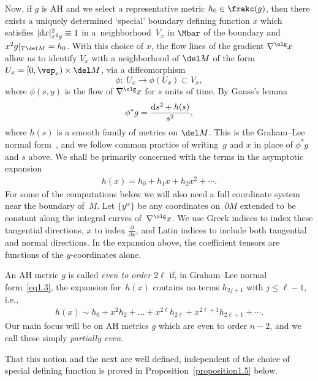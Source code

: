 Now, if $g$ is AH and we select a representative metric $h_0 \in \frakc(g)$, then there exists a uniquely determined
`special' boundary defining function $x$ which satisfies $|{\rm d}x|^2_{x^2 g} \equiv 1$ in a~neighborhood~$V_x$ in $\Mbar$ of the boundary and $x^2 g|_{T \del M} = h_0$.
With this choice of $x$, the flow lines of the gradient $\nabla^{\olg} x$ allow us to identify $V_x$ with a neighborhood of $\del M$ of the form $U_x = [0,\vep_x) \times \del M$, via a diffeomorphism
\[ \phi\colon \ U_x \longrightarrow \phi(U_x) \subset V_x, \]
where $\phi(s,y)$ is the flow of $\nabla^{\olg} x$ for $s$ units of time. By Gauss's lemma
\begin{gather} \label{eq1.3}
\phi^*g = \frac{{\rm d}s^2 + h(s)}{s^2},
\end{gather}
where $h(s)$ is a smooth family of metrics on $\del M$. This is the Graham--Lee normal form~\cite{GL}, and we follow common practice of writing~$g$ and $x$ in place of $\phi^* g$ and $s$ above. We shall be primarily concerned with the terms in the asymptotic expansion
\begin{gather*}
h(x) = h_0 + h_1 x + h_2 x^2 + \cdots.%
\end{gather*}
For some of the computations below we will also need a full coordinate system near the boundary of~$M$. Let $\{y^{\alpha}\}$ be any coordinates on~$\partial M$ extended to be constant along the integral curves of~$\nabla^{\olg} x$. We use Greek indices to index these tangential directions, $x$ to index $\frac{\partial}{\partial x}$, and Latin indices to include both tangential and normal directions. In the expansion above, the coefficient tensors are functions of the $y$-coordinates alone.

\begin{Definition}\label{definition1.1} \label{def1} An AH metric $g$ is called \emph{even to order $2\ell$} if, in Graham--Lee normal form~\eqref{eq1.3}, the expansion for~$h(x)$ contains no terms $h_{2j+1}$ with $j \leq \ell-1$, i.e.,
\begin{gather*}%
h(x) \sim h_0+x^2h_2 +\dots +x^{2\ell}h_{2\ell} +x^{2\ell+1}h_{2\ell+1}+ \cdots.
\end{gather*}
Our main focus will be on AH metrics $g$ which are even to order $n-2$, and we call these simply \emph{partially even}.
\end{Definition}

That this notion and the next are well defined, independent of the choice of special defining function is proved in Proposition~\ref{proposition1.5} below.

